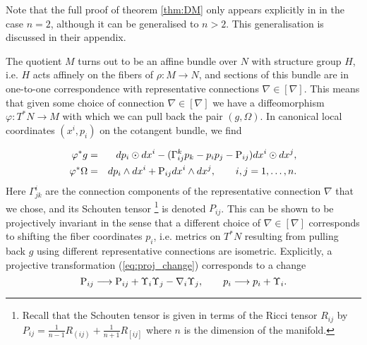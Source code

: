 Note that the full proof of theorem \ref{thm:DM} only appears explicitly in \cite{DM} in the case $n=2$, although it can be generalised to $n>2$. This generalisation is discussed in their appendix.

The quotient $M$ turns out to be an affine bundle over $N$ with
structure group $H$, i.e. $H$ acts affinely on the fibers of $\rho:M\rightarrow N$,
and sections of this bundle are in one-to-one correspondence with
representative connections $\nabla\in[\nabla]$. This means that given
some choice of connection $\nabla\in[\nabla]$ we have a diffeomorphism
$\varphi:T^{*}N\rightarrow M$ with which we can pull back the pair
$(g,\Omega)$. In canonical local coordinates $(x^{i},p_{i})$ on
the cotangent bundle, we find

\begin{eqnarray}
\varphi^{*}g & = &  dp_{i}\odot dx^{i}-(\Gamma_{ij}^{k}p_{k}-p_{i}p_{j}-\mathrm{P}_{ij}) dx^{i}\odot dx^{j},\label{eq:coord_form}\\
\varphi^{*}\Omega & = &  dp_{i}\wedge dx^{i}+\mathrm{P}_{ij} dx^{i}\wedge dx^{j},\qquad i,j=1,\dots ,n.\nonumber 
\end{eqnarray}
Here $\Gamma_{jk}^{i}$ are the connection components of the representative
connection $\nabla$ that we chose, and its Schouten tensor%
\footnote{Recall that the Schouten tensor is given in terms of the Ricci tensor
$R_{ij}$ by $P_{ij}=\frac{1}{n-1}R_{(ij)}+\frac{1}{n+1}R_{[ij]}$
where $n$ is the dimension of the manifold.%
} is denoted $P_{ij}$. This can be shown to be projectively invariant
in the sense that a different choice of $\nabla\in[\nabla]$ corresponds
to shifting the fiber coordinates $p_{i}$, i.e. metrics on $T^{*}N$
resulting from pulling back $g$ using different representative connections
are isometric. Explicitly, a projective transformation (\ref{eq:proj_change})
corresponds to a change
\begin{equation}
\mathrm{P}_{ij}\longrightarrow \mathrm{P}_{ij}+\Upsilon_{i}\Upsilon_{j}-\nabla_{i}\Upsilon_{j},\qquad p_{i}\longrightarrow p_{i}+\Upsilon_{i}.\label{eq:p_change}
\end{equation}


